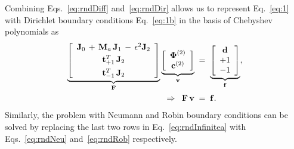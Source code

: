 \documentclass[%
secnumarabic,%
 amssymb, amsmath,%
 aps,prf,superscriptaddress,longbibliography
frontmatterverbose,
]{revtex4-2}
\begin{document}
Combining Eqs.~\eqref{eq:rndDiff} and~\eqref{eq:rndDir} allows us to represent Eq.~\eqref{eq:1} with Dirichlet boundary conditions Eq.~\eqref{eq:1b} in the basis of Chebyshev polynomials as
\begin{subequations}\label{eq:rndInfinite}
  \begin{align}
\underbrace{\left[\begin{array}{ccc}
   \mathbf J_0 \,+\, {\mathbf M}_a \, \mathbf J_1\, - \, \epsilon^2 \mathbf J_2 \\[0.1cm]
    \mathbf t_{+1}^T \, \mathbf J_2 \\[0.15cm]
    \mathbf t_{-1}^T \, \mathbf J_2
  \end{array}\right]}_{\mathbf{F}}\underbrace{\left[\begin{array}{c}
    \boldsymbol \Phi^{(2)} \\
    \mathbf c^{(2)}
  \end{array}\right]}_{\mathbf{v}} \;&=\; \underbrace{\left[\begin{array}{c}
  \mathbf d\\
  +1\\
  -1
  \end{array}\right]}_{\mathbf{f}},\label{eq:rndInfinitea}\\
  \Rightarrow \;\; \mathbf{F}\, \mathbf{v} \;&=\; \mathbf{f}.
\end{align}
\end{subequations}
Similarly, the problem with Neumann and Robin boundary conditions can be solved by replacing the last two rows in Eq.~\eqref{eq:rndInfinitea} with Eqs.~\eqref{eq:rndNeu} and~\eqref{eq:rndRob} respectively.
\end{document}
